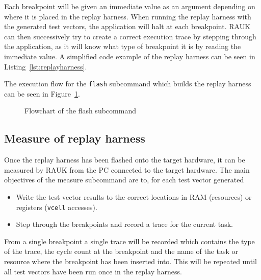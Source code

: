 Each breakpoint will be given an immediate value as an argument depending on
where it is placed in the replay harness. When running the replay harness with
the generated test vectors, the application will halt at each breakpoint. RAUK
can then successively try to create a correct execution trace by stepping
through the application, as it will know what type of breakpoint it is by reading
the immediate value. A simplified code example of the replay harness can be
seen in Listing~\ref{lst:replayharness}.

The execution flow for the \texttt{flash} subcommand which builds the replay
harness can be seen in Figure~\ref{fig:flashcmd}.
\begin{figure}[H]
    \centering
    \caption{Flowchart of the flash subcommand}
    \label{fig:flashcmd}
\end{figure}

\subsection{Measure of replay harness}
Once the replay harness has been flashed onto the target hardware, it can
be measured by RAUK from the PC connected to the target hardware. The main
objectives of the measure subcommand are to, for each test vector generated
\begin{itemize}
    \item Write the test vector results to the correct locations in RAM (resources) or registers (\texttt{vcell} accesses).
   \item Step through the breakpoints and record a trace for the current task.
\end{itemize}
From a single breakpoint a single trace will be recorded which contains the
type of the trace, the cycle count at the breakpoint and the name of the task
or resource where the breakpoint has been inserted into. This will be repeated
until all test vectors have been run once in the replay harness.

